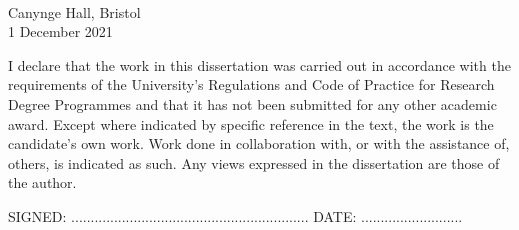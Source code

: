 \documentclass[a4paper, twoside]{templates/ociamthesis}
\begin{document}
\begin{romanpages}
\begin{acknowledgements}
  ~
  ~
  ~
  ~
  ~
  ~
  ~
  ~

  \begin{flushright}
  Canynge Hall, Bristol \\1 December 2021
  \end{flushright}
\end{acknowledgements}

\begin{declaration}
 	I declare that the work in this dissertation was carried out in accordance with the requirements of the University's Regulations and Code of Practice for Research Degree Programmes and that it has not been submitted for any other academic award. Except where indicated by specific reference in the text, the work is the candidate's own work. Work done in collaboration with, or with the assistance of, others, is indicated as such. Any views expressed in the dissertation are those of the author.

  \begin{flushright}
  SIGNED: .............................................................         DATE: ..........................\\
  \end{flushright}
\end{declaration}

% 
  \dominitoc %

\flushbottom

\tableofcontents

\listoffigures
	\mtcaddchapter

\listoftables
  \mtcaddchapter


\end{romanpages}
\end{document}
